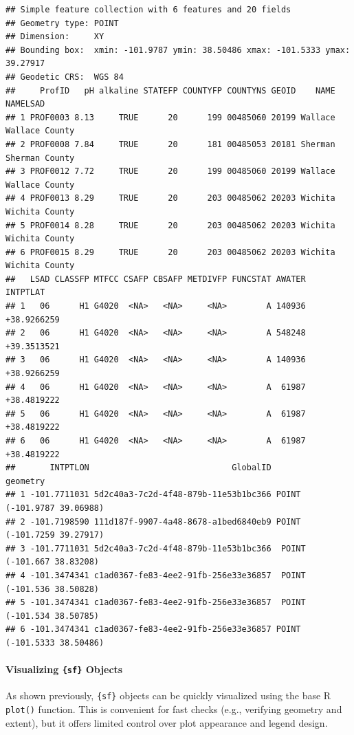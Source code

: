 \documentclass[
  10pt,
  b5paper,
  oneside]{book}
\begin{document}
\begin{verbatim}
## Simple feature collection with 6 features and 20 fields
## Geometry type: POINT
## Dimension:     XY
## Bounding box:  xmin: -101.9787 ymin: 38.50486 xmax: -101.5333 ymax: 39.27917
## Geodetic CRS:  WGS 84
##     ProfID   pH alkaline STATEFP COUNTYFP COUNTYNS GEOID    NAME       NAMELSAD
## 1 PROF0003 8.13     TRUE      20      199 00485060 20199 Wallace Wallace County
## 2 PROF0008 7.84     TRUE      20      181 00485053 20181 Sherman Sherman County
## 3 PROF0012 7.72     TRUE      20      199 00485060 20199 Wallace Wallace County
## 4 PROF0013 8.29     TRUE      20      203 00485062 20203 Wichita Wichita County
## 5 PROF0014 8.28     TRUE      20      203 00485062 20203 Wichita Wichita County
## 6 PROF0015 8.29     TRUE      20      203 00485062 20203 Wichita Wichita County
##   LSAD CLASSFP MTFCC CSAFP CBSAFP METDIVFP FUNCSTAT AWATER    INTPTLAT
## 1   06      H1 G4020  <NA>   <NA>     <NA>        A 140936 +38.9266259
## 2   06      H1 G4020  <NA>   <NA>     <NA>        A 548248 +39.3513521
## 3   06      H1 G4020  <NA>   <NA>     <NA>        A 140936 +38.9266259
## 4   06      H1 G4020  <NA>   <NA>     <NA>        A  61987 +38.4819222
## 5   06      H1 G4020  <NA>   <NA>     <NA>        A  61987 +38.4819222
## 6   06      H1 G4020  <NA>   <NA>     <NA>        A  61987 +38.4819222
##       INTPTLON                             GlobalID                   geometry
## 1 -101.7711031 5d2c40a3-7c2d-4f48-879b-11e53b1bc366 POINT (-101.9787 39.06988)
## 2 -101.7198590 111d187f-9907-4a48-8678-a1bed6840eb9 POINT (-101.7259 39.27917)
## 3 -101.7711031 5d2c40a3-7c2d-4f48-879b-11e53b1bc366  POINT (-101.667 38.83208)
## 4 -101.3474341 c1ad0367-fe83-4ee2-91fb-256e33e36857  POINT (-101.536 38.50828)
## 5 -101.3474341 c1ad0367-fe83-4ee2-91fb-256e33e36857  POINT (-101.534 38.50785)
## 6 -101.3474341 c1ad0367-fe83-4ee2-91fb-256e33e36857 POINT (-101.5333 38.50486)
\end{verbatim}

\paragraph*{\texorpdfstring{Visualizing \texttt{\{sf\}} Objects}{Visualizing \{sf\} Objects}}\label{visualizing-sf-objects}

As shown previously, \texttt{\{sf\}} objects can be quickly visualized using the base R \texttt{plot()} function. This is convenient for fast checks (e.g., verifying geometry and extent), but it offers limited control over plot appearance and legend design.
\end{document}
